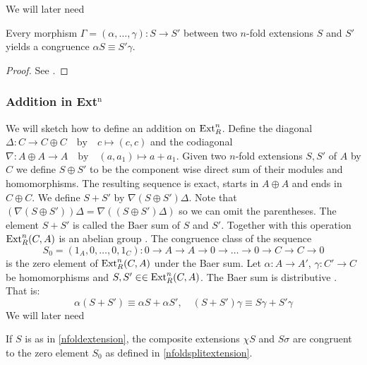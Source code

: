 We will later need
\begin{lemma}
\label{lemma:morphisminducescongruence_n}
Every morphism $\Gamma = (\alpha,\dots,\gamma) : S \to S'$ between two $n$-fold extensions $S$ and $S'$ yields a congruence $\alpha S \equiv S' \gamma$.
\end{lemma}
\begin{proof}
See \cite[Proposition III.5.1.]{maclane}.
\end{proof}
\subsubsection{Addition in Ext$^\text{n}$}
\label{ss:addition_in_ext}
We will sketch how to define an addition on $\operatorname{Ext}^{n}_{R}$.
Define the diagonal
$\Delta:  C \to C \oplus C \quad \text{by} \quad c \mapsto (c,c)$
and the codiagonal
$\nabla: A \oplus A \to A \quad \text{by} \quad (a,a_1) \mapsto a + a_1$.
Given two $n$-fold extensions $S,S'$ of $A$ by $C$ we define $S \oplus S'$ to be the component wise direct sum of their modules and homomorphisms.
The resulting sequence is exact, starts in $A \oplus A$ and ends in $C \oplus C$.
We define $S + S'$ by $\nabla (S \oplus S') \Delta$.
Note that $(\nabla (S \oplus S')) \Delta = \nabla ((S \oplus S') \Delta)$ so we can omit the parentheses.
The element $S+S'$ is called the Baer sum of $S$ and $S'$.
Together with this operation $\operatorname{Ext}^{n}_{R}(C,A)$ is an abelian group \cite[p. 85]{maclane}.
The congruence class of the sequence 
\begin{equation}
\label{nfoldsplitextension}
S_0 = (1_A,0,\dots,0,1_C): 0\to A\to A \to 0 \to \dots \to 0 \to C \to C \to 0
\end{equation} 
is the zero element of $\operatorname{Ext}^{n}_{R}(C,A)$ under the Baer sum.
Let $\alpha: A \to A'$, $\gamma: C' \to C$ be homomorphisms and $S,S' \in \in \operatorname{Ext}^{n}_{R}(C,A)$.
The Baer sum is distributive \cite[see Theorem 5.3.]{maclane}.
That is:
\begin{equation*}
\alpha (S + S') \equiv \alpha S + \alpha S', \quad
(S + S')\gamma \equiv S\gamma + S' \gamma
\end{equation*}
We will later need
\begin{lemma}
\label{lemma:nfoldcomposite}
If $S$ is as in \eqref{nfoldextension}, the composite extensions $\chi S$ and $S \sigma$ are congruent to the zero element $S_0$ as defined in \eqref{nfoldsplitextension}.
\end{lemma}
